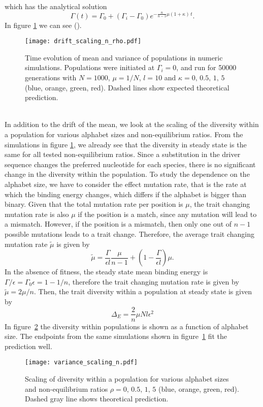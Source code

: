 which has the analytical solution
\begin{equation}
    \Gamma(t) = \Gamma_0 + (\Gamma_i - \Gamma_0)e^{-\frac{n}{n-1}\mu\left(1+\kappa\right)\, t}. 
\end{equation}
In figure \ref{fig:drift_scaling_n_rho} we can see ().
\begin{figure}
    \centering
    \texttt{[image: drift\_scaling\_n\_rho.pdf]}
    \caption{Time evolution of mean and variance of populations in numeric simulations. Populations were initiated at $\Gamma_i=0$, and run for 50000 generations with $N=1000$, $\mu = 1/N$, $l=10$ and $\kappa= 0,\,0.5,\,1,\,5$ (blue, orange, green, red). Dashed lines show expected theoretical prediction.}
    \label{fig:drift_scaling_n_rho}
\end{figure}\\

\noindent In addition to the drift of the mean, we look at the scaling of the diversity within a population for various alphabet sizes and non-equilibrium ratios. From the simulations in figure \ref{fig:drift_scaling_n_rho}, we already see that the diversity in steady state is the same for all tested non-equilibrium ratios. Since a substitution in the driver sequence changes the preferred nucleotide for each species, there is no significant change in the diversity within the population. To study the dependence on the alphabet size, we have to consider the effect mutation rate, that is the rate at which the binding energy changes, which differs if the alphabet is bigger than binary. Given that the total mutation rate per position is $\mu$, the trait changing mutation rate is also $\mu$ if the position is a match, since any mutation will lead to a mismatch. However, if the position is a mismatch, then only one out of $n-1$ possible mutations leads to a trait change. Therefore, the average trait changing mutation rate $\tilde \mu$ is given by
\begin{equation}
    \tilde \mu = \frac{\Gamma}{\epsilon l} \frac{\mu}{n-1} + \left(1 - \frac{\Gamma}{\epsilon l} \right) \mu.
\end{equation}
In the absence of fitness, the steady state mean binding energy is $\Gamma/\epsilon=\Gamma_0\epsilon=1-1/n$, therefore the trait changing mutation rate is given by $\tilde \mu = 2\mu/n$. Then, the trait diversity within a population at steady state is given by 
\begin{equation}
    \Delta_E = \frac{2}{n}\mu Nl\epsilon^2
\end{equation}
In figure~\ref{fig:variance_scaling_n} the diversity within populations is shown as a function of alphabet size. The endpoints from the same simulations shown in figure~\ref{fig:drift_scaling_n_rho} fit the prediction well.

\begin{figure}
    \centering
    \texttt{[image: variance\_scaling\_n.pdf]}
    \caption{Scaling of diversity within a population for various alphabet sizes and non-equilibrium ratios $\rho= 0,\,0.5,\,1,\,5$ (blue, orange, green, red). Dashed gray line shows theoretical prediction.}
    \label{fig:variance_scaling_n}
\end{figure}


